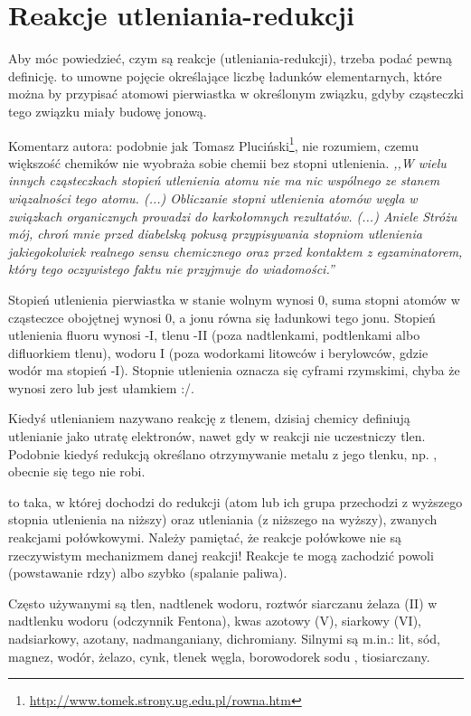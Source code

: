 \section{Reakcje utleniania-redukcji}
\label{section_chemical_reactions_redox}
Aby móc powiedzieć, czym są reakcje  (utleniania-redukcji), trzeba podać pewną definicję.
 to umowne pojęcie określające liczbę ładunków elementarnych, które można by przypisać atomowi pierwiastka w określonym związku, gdyby cząsteczki tego związku miały budowę jonową.

Komentarz autora: podobnie jak Tomasz Pluciński\footnote{\url{http://www.tomek.strony.ug.edu.pl/rowna.htm}}, nie rozumiem, czemu większość chemików nie wyobraża sobie chemii bez stopni utlenienia.
\emph{,,W wielu innych cząsteczkach stopień utlenienia atomu nie ma nic wspólnego ze stanem wiązalności tego atomu. (...) Obliczanie stopni utlenienia atomów węgla w związkach organicznych prowadzi do karkołomnych rezultatów. (...) Aniele Stróżu mój, chroń mnie przed diabelską pokusą przypisywania stopniom utlenienia jakiegokolwiek realnego sensu chemicznego oraz przed kontaktem z egzaminatorem, który tego oczywistego faktu nie przyjmuje do wiadomości.''}

Stopień utlenienia pierwiastka w stanie wolnym wynosi 0, suma stopni atomów w cząsteczce obojętnej wynosi 0, a jonu równa się ładunkowi tego jonu.
Stopień utlenienia fluoru wynosi -I, tlenu -II (poza nadtlenkami, podtlenkami albo difluorkiem tlenu), wodoru I (poza wodorkami litowców i berylowców, gdzie wodór ma stopień -I).
Stopnie utlenienia oznacza się cyframi rzymskimi, chyba że wynosi zero lub jest ułamkiem :/.

Kiedyś utlenianiem nazywano reakcję z tlenem, dzisiaj chemicy definiują utlenianie jako utratę elektronów, nawet gdy w reakcji nie uczestniczy tlen.
Podobnie kiedyś redukcją określano otrzymywanie metalu z jego tlenku, np. , obecnie się tego nie robi.

 to taka, w której dochodzi do redukcji (atom lub ich grupa przechodzi z wyższego stopnia utlenienia na niższy) oraz utleniania (z niższego na wyższy), zwanych reakcjami połówkowymi.
Należy pamiętać, że reakcje połówkowe nie są rzeczywistym mechanizmem danej reakcji!
Reakcje te mogą zachodzić powoli (powstawanie rdzy) albo szybko (spalanie paliwa).

Często używanymi  są tlen, nadtlenek wodoru, roztwór siarczanu żelaza (II) w nadtlenku wodoru (odczynnik Fentona), kwas azotowy (V), siarkowy (VI), nadsiarkowy, azotany, nadmanganiany, dichromiany.
Silnymi  są m.in.: lit, sód, magnez, wodór, żelazo, cynk, tlenek węgla, borowodorek sodu , tiosiarczany.

